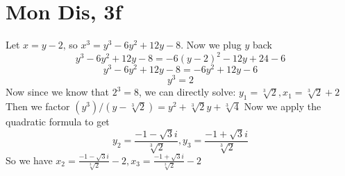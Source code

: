 \documentclass[12pt]{article}
\begin{document}
\section{Mon Dis, 3f}
Let $x=y-2$, so $x^3=y^3-6y^2+12y-8$. Now we plug $y$ back
$$y^3-6y^2+12y-8 = -6(y-2)^2-12y+24-6$$
$$y^3-6y^2+12y-8 = -6y^2+12y-6$$
$$y^3 = 2$$
Now since we know that $2^3=8$, we can directly solve:
$y_1= \sqrt[3]{2}, x_1=\sqrt[3]{2}+2$
\newline
Then we factor $(y^3)/(y-\sqrt[3]{2})=y^2+\sqrt[3]{2}y+\sqrt[3]{4}$ Now we apply the quadratic formula to get
$$y_2=\frac{-1-\sqrt3i}{\sqrt[3]{2}}, y_3=\frac{-1+\sqrt3i}{\sqrt[3]{2}}$$
So we have $x_2=\frac{-1-\sqrt3i}{\sqrt[3]{2}}-2, x_3=\frac{-1+\sqrt3i}{\sqrt[3]{2}}-2$
\end{document}
